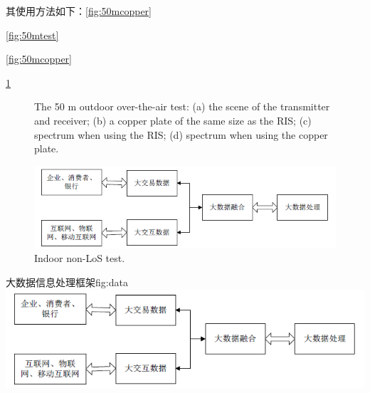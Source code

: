 \documentclass[supercite]{HustGraduPaper}
\begin{document}
其使用方法如下：\autoref{fig:50mcopper}


\autoref{fig:50mtest}

\ref{fig:50mcopper}

\ref{fig:50mtest}

\begin{figure}[t!]
	\centering
	\hfil
	\hfil
	\hfil
	\caption{The 50 m outdoor over-the-air test: (a) the scene of the transmitter and receiver; (b) a copper plate of the same size as the RIS; (c) spectrum when using the RIS; (d) spectrum when using the copper plate.}
	\label{fig:50mtest}
\end{figure}

\begin{figure}[htb]
	\centering
	\includegraphics[width=0.5\linewidth]{Figures/data.png}
	\caption{Indoor non-LoS test.}
	\label{fig:through_wall}
\end{figure}

\begin{generalfig}[htb]{大数据信息处理框架}{fig:data}
	\includegraphics[width=0.4\linewidth]{Figures/data.png}
\end{generalfig}
\end{document}
